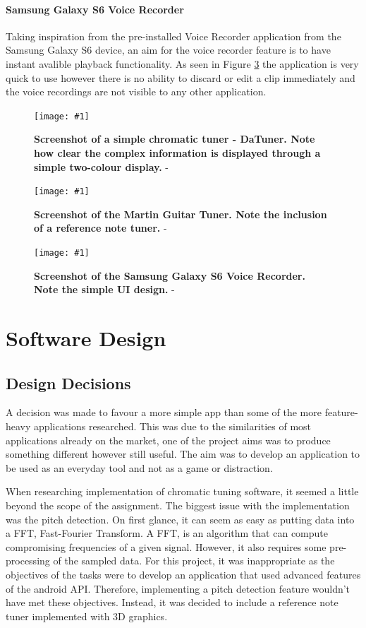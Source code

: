 \documentclass[conference]{acmsiggraph}
\newcommand{\figuremacroW}[4]{
	\begin{figure}[H] %
		\centering
		\texttt{[image: \#1]}
		\caption[#2]{\textbf{#2} - #3}
		\label{fig:#1}
	\end{figure}
}
\begin{document}
\paragraph{Samsung Galaxy S6 Voice Recorder}

Taking inspiration from the pre-installed Voice Recorder application from the Samsung Galaxy S6 device, an aim for the voice recorder feature is to have instant avalible playback functionality. As seen in Figure \ref{fig:voice} the application is very quick to use however there is no ability to discard or edit a clip immediately and the voice recordings are not visible to any other application.

\figuremacroW
{daTune}
{Screenshot of a simple chromatic tuner - DaTuner. Note how clear the complex information is displayed through a simple two-colour display.}
{\protect\cite{DaTune}}
{0.75}

\figuremacroW
{martinTuner}
{Screenshot of the Martin Guitar Tuner. Note the inclusion of a reference note tuner.}
{\protect\cite{Martin}}
{0.75}

\figuremacroW
{voice}
{Screenshot of the Samsung Galaxy S6 Voice Recorder. Note the simple UI design.}
{\protect\cite{Samsung}}
{0.75}

\section{Software Design}

\subsection{Design Decisions}

A decision was made to favour a more simple app than some of the more feature-heavy applications researched. This was due to the similarities of most applications already on the market, one of the project aims was to produce something different however still useful. The aim was to develop an application to be used as an everyday tool and not as a game or distraction.

When researching implementation of chromatic tuning software, it seemed a little beyond the scope of the assignment. The biggest issue with the implementation was the pitch detection. On first glance, it can seem as easy as putting data into a FFT, Fast-Fourier Transform. A FFT, is an algorithm that can compute compromising frequencies of a given signal. \cite{FFT} However, it also requires some pre-processing of the sampled data. For this project, it was inappropriate as the objectives of the tasks were to develop an application that used advanced features of the android API. Therefore, implementing a pitch detection feature wouldn't have met these objectives. Instead, it was decided to include a reference note tuner implemented with 3D graphics.
\end{document}
